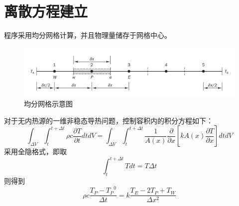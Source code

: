 \documentclass[10pt]{scrartcl}
\begin{document}
\section{离散方程建立}
程序采用均分网格计算，并且物理量储存于网格中心。
\begin{figure}[H]
	\centering
	\includegraphics[width=0.8\linewidth]{2}
	\caption{均分网格示意图}
	\label{fig:2}
\end{figure}
对于无内热源的一维非稳态导热问题，控制容积内的积分方程如下：
\begin{equation}
	\int_{\Delta V}\int_{t}^{t+\Delta t}\rho c \frac{\partial T}{\partial t}dtdV=\int_{\Delta V}\int_{t}^{t+\Delta t}\frac{1}{A(x)}\frac{\partial}{\partial x}[kA(x)\frac{\partial T}{\partial x}]dtdV
\end{equation}
采用全隐格式，即取
\begin{equation}
	\int_{t}^{t+\Delta t}Tdt = T\Delta t
\end{equation}
则得到
\begin{equation}\label{res}
	\rho c \frac{T_P-{T_P}^0}{\Delta t} = k \frac{T_E-2T_P+T_W}{\Delta x^2}
\end{equation}
\end{document}
